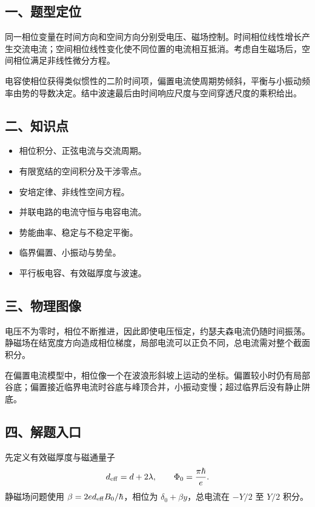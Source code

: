 \documentclass[12pt,a4paper,fontset=fandol]{ctexart}
\providecommand{\tightlist}{\setlength{\itemsep}{0pt}\setlength{\parskip}{0pt}}
\begin{document}
\subsection{一、题型定位}\label{ux4e00ux9898ux578bux5b9aux4f4d-4}

同一相位变量在时间方向和空间方向分别受电压、磁场控制。时间相位线性增长产生交流电流；空间相位线性变化使不同位置的电流相互抵消。考虑自生磁场后，空间相位满足非线性微分方程。

电容使相位获得类似惯性的二阶时间项，偏置电流使周期势倾斜，平衡与小振动频率由势的导数决定。结中波速最后由时间响应尺度与空间穿透尺度的乘积给出。

\subsection{二、知识点}\label{ux4e8cux77e5ux8bc6ux70b9-4}

\begin{itemize}
\tightlist
\item
  相位积分、正弦电流与交流周期。
\item
  有限宽结的空间积分及干涉零点。
\item
  安培定律、非线性空间方程。
\item
  并联电路的电流守恒与电容电流。
\item
  势能曲率、稳定与不稳定平衡。
\item
  临界偏置、小振动与势垒。
\item
  平行板电容、有效磁厚度与波速。
\end{itemize}

\subsection{三、物理图像}\label{ux4e09ux7269ux7406ux56feux50cf-4}

电压不为零时，相位不断推进，因此即使电压恒定，约瑟夫森电流仍随时间振荡。静磁场在结宽度方向造成相位梯度，局部电流可以正负不同，总电流需对整个截面积分。

在偏置电流模型中，相位像一个在波浪形斜坡上运动的坐标。偏置较小时仍有局部谷底；偏置接近临界电流时谷底与峰顶合并，小振动变慢；超过临界后没有静止阱底。

\subsection{四、解题入口}\label{ux56dbux89e3ux9898ux5165ux53e3-4}

先定义有效磁厚度与磁通量子 \[
d_{\rm eff}=d+2\lambda,\qquad
\Phi_0=\frac{\pi\hbar}{e}.
\] 静磁场问题使用 \(\beta=2ed_{\rm eff}B_0/\hbar\)，相位为
\(\delta_0+\beta y\)，总电流在 \(-Y/2\) 至 \(Y/2\) 积分。
\end{document}

